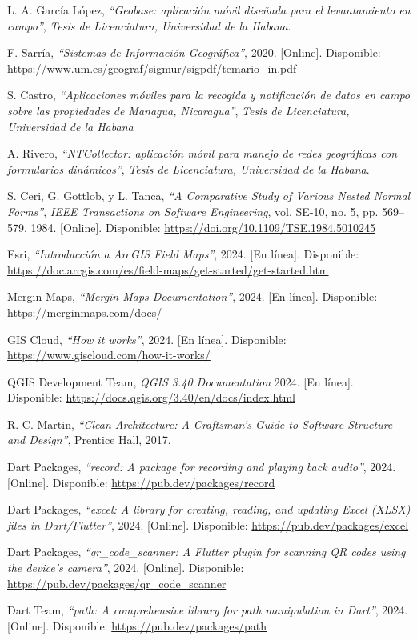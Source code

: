 \documentclass[12pt, a4paper]{book}
\begin{document}
\begin{thebibliography}{9}

  L. A. García López, \textit{``Geobase: aplicación móvil diseñada para el levantamiento en campo''}, \textit{Tesis de Licenciatura, Universidad de la Habana}.

  F. Sarría, \textit{``Sistemas de Información Geográfica''}, 2020. [Online]. Disponible: \url{https://www.um.es/geograf/sigmur/sigpdf/temario_in.pdf}
  
  S. Castro, \textit{``Aplicaciones móviles para la recogida y notificación de datos en campo sobre las propiedades de Managua, Nicaragua''}, \textit{Tesis de Licenciatura, Universidad de la Habana}
  
  A. Rivero, \textit{``NTCollector: aplicación móvil para manejo de redes geográficas con formularios dinámicos''}, \textit{Tesis de Licenciatura, Universidad de la Habana}.

  S. Ceri, G. Gottlob, y L. Tanca, \textit{``A Comparative Study of Various Nested Normal Forms''}, \textit{IEEE Transactions on Software Engineering}, vol. SE-10, no. 5, pp. 569--579, 1984. [Online]. Disponible: \url{https://doi.org/10.1109/TSE.1984.5010245}

  Esri, \textit{``Introducción a ArcGIS Field Maps''}, 2024. [En línea]. Disponible: \url{https://doc.arcgis.com/es/field-maps/get-started/get-started.htm}

  Mergin Maps, \textit{``Mergin Maps Documentation''}, 2024. [En línea]. Disponible: \url{https://merginmaps.com/docs/}

  GIS Cloud, \textit{``How it works''}, 2024. [En línea]. Disponible: \url{https://www.giscloud.com/how-it-works/}

  QGIS Development Team, \textit{QGIS 3.40 Documentation} 2024. [En línea]. Disponible: \url{https://docs.qgis.org/3.40/en/docs/index.html}

  R. C. Martin, \textit{``Clean Architecture: A Craftsman's Guide to Software Structure and Design''}, Prentice Hall, 2017.

  Dart Packages, \textit{``record: A package for recording and playing back audio''}, 2024. [Online]. Disponible: \url{https://pub.dev/packages/record}

  Dart Packages, \textit{``excel: A library for creating, reading, and updating Excel (XLSX) files in Dart/Flutter''}, 2024. [Online]. Disponible: \url{https://pub.dev/packages/excel}
  
  Dart Packages, \textit{``qr\_code\_scanner: A Flutter plugin for scanning QR codes using the device's camera''}, 2024. [Online]. Disponible: \url{https://pub.dev/packages/qr_code_scanner}

  Dart Team, \textit{``path: A comprehensive library for path manipulation in Dart''}, 2024. [Online]. Disponible: \url{https://pub.dev/packages/path}

\end{thebibliography}
\end{document}
